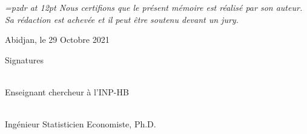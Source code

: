 \documentclass[a4paper,12pt]{report}
\begin{document}
\newpage
\begin{flushleft}
\end{flushleft}

 {\large\em \font\pzdr=pzdr at 12pt
\noindent
Nous certifions que le présent mémoire est réalisé par son auteur. Sa rédaction est achevée et il peut être soutenu devant un jury.

\vspace*{3cm}
\begin{center}
Abidjan, le 29 Octobre 2021
\end{center}

\vspace*{3cm}
\begin{center}
Signatures
\end{center}

\vspace*{3cm}

\hspace*{0cm}{\large\bf Directeur de memoire}

\vspace{3cm}
\hspace*{1,4cm}{  Dr Tanoh Lambert,}\\
\hspace*{0cm} { Enseignant chercheur \`a l'INP-HB }\\



\hspace*{1.5cm}
\vspace*{-7.1cm}

\hspace*{10.3cm}{\large\bf Ma\^itre de stage}


\vspace*{3cm}
\hspace*{10.15cm}{    M. Firmin VLAVONOU,}\\
\hspace*{8.5cm} {    Ingénieur Statisticien Economiste, Ph.D.}\\



}
\end{document}
